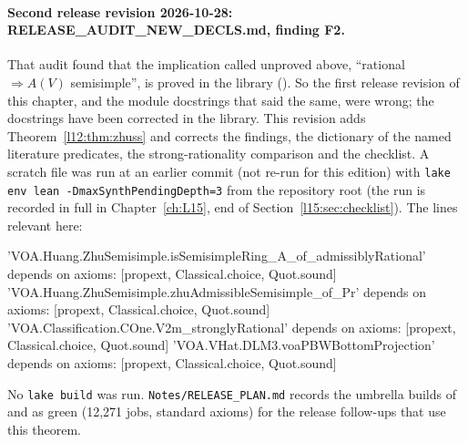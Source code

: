 \paragraph{Second release revision 2026-10-28: RELEASE\_AUDIT\_NEW\_DECLS.md, finding F2.} That audit found that the
implication called unproved above, ``rational $\Rightarrow A(V)$ semisimple'', is proved in the library
(\allowbreak{}\allowbreak{}\allowbreak{}). So the first
release revision of this chapter, and the module docstrings that said the same, were wrong; the docstrings have been
corrected in the library. This revision adds Theorem~\ref{l12:thm:zhuss} and corrects the findings, the dictionary of the
named literature predicates, the strong-rationality comparison and the checklist. A scratch file was run at
an earlier commit (not re-run for this edition) with \texttt{lake env lean -DmaxSynthPendingDepth=3} from the repository root (the run is recorded in full in
Chapter~\ref{ch:L15}, end of Section~\ref{l15:sec:checklist}). The lines relevant here:
\begin{plaincode}
'VOA.Huang.ZhuSemisimple.isSemisimpleRing_A_of_admissiblyRational' depends on axioms: [propext,
 Classical.choice,
 Quot.sound]
'VOA.Huang.ZhuSemisimple.zhuAdmissibleSemisimple_of_Pr' depends on axioms: [propext, Classical.choice, Quot.sound]
'VOA.Classification.COne.V2m_stronglyRational' depends on axioms: [propext, Classical.choice, Quot.sound]
'VOA.VHat.DLM3.voaPBWBottomProjection' depends on axioms: [propext, Classical.choice, Quot.sound]
\end{plaincode}
No \texttt{lake build} was run. \texttt{Notes/RELEASE\_PLAN.md} records the umbrella builds of  and
 as green (12,271 jobs, standard axioms) for the release follow-ups that use this theorem.


